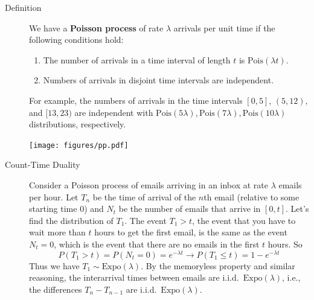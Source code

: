 \documentclass[10pt,landscape]{article}
\newcommand{\Expo}{\textrm{Expo}}
\newcommand{\Pois}{\textrm{Pois}}
\begin{document}
\begin{multicols*}{3}
\begin{description}
\item[Definition] We have a \textbf{Poisson process} of rate $\lambda$ arrivals per unit time if the following conditions hold:
\begin{enumerate}
    \item The number of arrivals in a time interval of length $t$ is $\Pois(\lambda t)$.
    \item Numbers of arrivals in disjoint time intervals are independent.
\end{enumerate}
For example, the numbers of arrivals in the time intervals $[0,5]$, $(5,12),$ and $[13,23)$ are independent with $\Pois(5\lambda), \Pois(7\lambda), \Pois(10\lambda)$ distributions, respectively.
\begin{minipage}{\linewidth}
            \centering
\texttt{[image: figures/pp.pdf]}
        \end{minipage}

\item[Count-Time Duality]  Consider a Poisson process of emails arriving in an inbox at rate $\lambda$ emails per hour. Let $T_n$ be the time of arrival of the $n$th email (relative to some starting time $0$) and $N_t$ be the number of emails that arrive in $[0,t]$. Let's find the distribution of $T_1$. The event $T_1 > t$, the event that you have to wait more than $t$ hours to get the first email, is the same as the event $N_t = 0$, which is the event that there are no emails in the first $t$ hours. So
\[P(T_1 > t) = P(N_t = 0) = e^{-\lambda t} \longrightarrow P(T_1 \leq t) = 1 - e^{-\lambda t}\]
Thus we have $T_1 \sim \Expo(\lambda)$. By the memoryless property and similar reasoning, the interarrival times between emails are i.i.d.~$\Expo(\lambda)$, i.e., the differences $T_n - T_{n-1}$ are i.i.d.~$\Expo(\lambda)$.
\end{description}


\end{multicols*}
\end{document}
